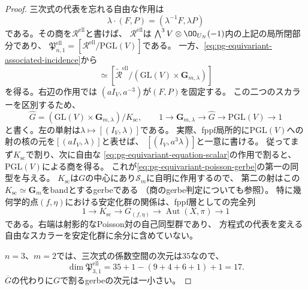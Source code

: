 \begin{proof}
三次式の代表を忘れる自由な作用は
\begin{equation}
 \lambda\cdot(F,P)=(\lambda^{-1}F,\lambda P)
 \label{eq:pg-equivariant-equation-scalar}
\end{equation}
である。その商を$\mathscr R^{\mathrm{ell}}$と書けば、
$\mathscr R^{\mathrm{ell}}$は
$\bigwedge^3V\otimes\OO_{U_N}(-1)$内の上記の局所閉部分であり、
$\mathfrak P_{n,1}^{\mathrm{ell}}
 =[\mathscr R^{\mathrm{ell}}/\mathrm{PGL}(V)]$である。
一方、\eqref{eq:pg-equivariant-associated-incidence}から
\begin{equation}
 [\mathscr S_m/G]
 \simeq
 [\widetilde{\mathscr R}^{\mathrm{ell}}/
       (\mathrm{GL}(V)\times\mathbf G_{m,\lambda})]
 \label{eq:pg-equivariant-two-quotients}
\end{equation}
を得る。右辺の作用では
$(aI_V,a^{-3})$が$(F,P)$を固定する。
この二つのスカラーを区別するため、
\begin{equation}
 \widehat G=(\mathrm{GL}(V)\times\mathbf G_{m,\lambda})/K_{\mathrm{sc}},
 \qquad
 1\longrightarrow\mathbf G_{m,\lambda}
 \longrightarrow\widehat G
 \longrightarrow\mathrm{PGL}(V)\longrightarrow1
 \label{eq:pg-equivariant-effective-group-sequence}
\end{equation}
と書く。左の単射は$\lambda\mapsto[(I_V,\lambda)]$である。
実際、fppf局所的に$\mathrm{PGL}(V)$への射の核の元を$[(aI_V,\lambda)]$と表せば、
$[(I_V,a^3\lambda)]$と一意に書ける。
従ってまず$K_{\mathrm{sc}}$で割り、次に自由な
\eqref{eq:pg-equivariant-equation-scalar}の作用で割ると、
$\mathrm{PGL}(V)$による商を得る。
これが\eqref{eq:pg-equivariant-poisson-gerbe}の第一の同型を与える。
$K_{\mathrm{sc}}$は$G$の中心にあり$\mathscr S_m$に自明に作用するので、
第二の射はこの$K_{\mathrm{sc}}\simeq\mathbf G_m$をbandとするgerbeである
（商のgerbe判定について\cite[Lemma~78.27.1, Tag~\texttt{06PD}]{PStacks}も参照）。
特に幾何学的点$(f,\eta)$における安定化群の関係は、fppf層としての完全列
\begin{equation}
 1\longrightarrow K_{\mathrm{sc}}
 \longrightarrow G_{(f,\eta)}
 \longrightarrow\operatorname{Aut}(X,\pi)\longrightarrow1
 \label{eq:pg-equivariant-stabilizer-sequence}
\end{equation}
である。右端は射影的なPoisson対の自己同型群であり、
方程式の代表を変える自由なスカラーを安定化群に余分に含めていない。

$n=3$、$m=2$では、三次式の係数空間の次元は$35$なので、
\begin{equation}
 \dim\mathfrak P_{3,1}^{\mathrm{ell}}
 =35+1-(9+4+6+1)+1=17.
 \label{eq:pg-equivariant-threefold-stack-dimension}
\end{equation}
$\overline G$の代わりに$G$で割るgerbeの次元は一小さい。
\end{proof}

